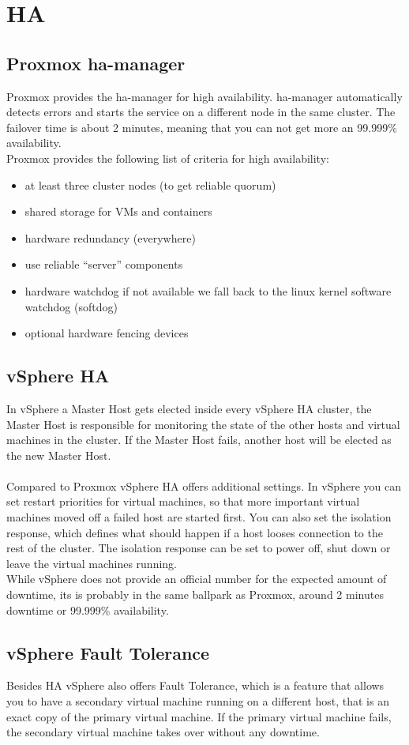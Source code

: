 \section{HA}

\subsection{Proxmox ha-manager}
Proxmox provides the ha-manager for high availability. ha-manager automatically detects errors and starts the service on a different node in the same cluster. The failover time is about 2 minutes, meaning that you can not get more an 99.999\% availability.
\\
Proxmox provides the following list of criteria for high availability:

\begin{itemize}
    \item at least three cluster nodes (to get reliable quorum)
    \item shared storage for VMs and containers
    \item hardware redundancy (everywhere)
    \item use reliable “server” components
    \item hardware watchdog \- if not available we fall back to the linux kernel software watchdog (softdog)
    \item optional hardware fencing devices
\end{itemize}

\subsection{vSphere HA}
In vSphere a Master Host gets elected inside every vSphere HA cluster, the Master Host is responsible for monitoring the state of the other hosts and virtual machines in the cluster. If the Master Host fails, another host will be elected as the new Master Host.
\\\\
Compared to Proxmox vSphere HA offers additional settings. In vSphere you can set restart priorities for virtual machines, so that more important virtual machines moved off a failed host are started first. You can also set the isolation response, which defines what should happen if a host looses connection to the rest of the cluster. The isolation response can be set to power off, shut down or leave the virtual machines running.
\\
While vSphere does not provide an official number for the expected amount of downtime, its is probably in the same ballpark as Proxmox, around 2 minutes downtime or 99.999\% availability.

\subsection{vSphere Fault Tolerance}

Besides HA vSphere also offers Fault Tolerance, which is a feature that allows you to have a secondary virtual machine running on a different host, that is an exact copy of the primary virtual machine. If the primary virtual machine fails, the secondary virtual machine takes over without any downtime. 